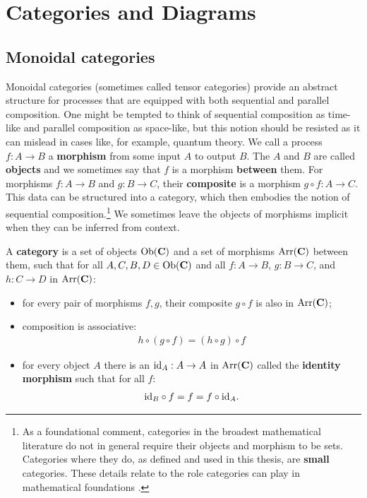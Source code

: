 \chapter{Categories and Diagrams}
\label{chap:cats}

\section{Monoidal categories}
Monoidal categories (sometimes called tensor categories) provide an abstract structure for processes that are equipped with both sequential and parallel composition. One might be tempted to think of sequential composition as time-like and parallel composition as space-like, but this notion should be resisted as it can mislead in cases like, for example, quantum theory.  We call a process $f:A\to B$ a \textbf{morphism} from some input $A$ to output $B$. The $A$ and $B$ are called \textbf{objects} and we sometimes say that $f$ is a morphism \textbf{between} them. For morphisms $f:A\to B$ and $g:B\to C$, their \textbf{composite} is a morphism $g\circ f:A\to C$. This data can be structured into a category, which then embodies the notion of sequential composition.\footnote{As a foundational comment, categories in the broadest mathematical literature do not in general require their objects and morphism to be sets. Categories where they do, as defined and used in this thesis, are \textbf{small} categories. These details relate to the role categories can play in mathematical foundations \cite{mac1969one}.} We sometimes leave the objects of morphisms implicit when they can be inferred from context.

\begin{defn}
A \textbf{category}  is a set of objects $\mbox{Ob}(\mathbf{C})$ and a set of morphisms $\mbox{Arr}(\mathbf{C})$ between them, such that for all $A,C,B,D\in \mbox{Ob}(\mathbf{C})$ and all $f:A\to B$, $g:B\to C$, and $h:C\to D$ in $\mbox{Arr}(\mathbf{C})$:
\begin{itemize}
\item for every pair of morphisms $f,g$, their composite $g\circ f$ is also in $\mbox{Arr}(\mathbf{C})$;
\item composition is associative:
\begin{align}
h\circ(g\circ f) = (h\circ g)\circ f
\end{align}
\item for every object $A$ there is an $\mbox{id}_{A}:A\to A$ in $\mbox{Arr}(\mathbf{C})$ called the \textbf{identity morphism} such that for all $f$:
\begin{align}
\mbox{id}_{B}\circ f = f = f\circ\mbox{id}_{A}.
\end{align}
\end{itemize}
\end{defn}

